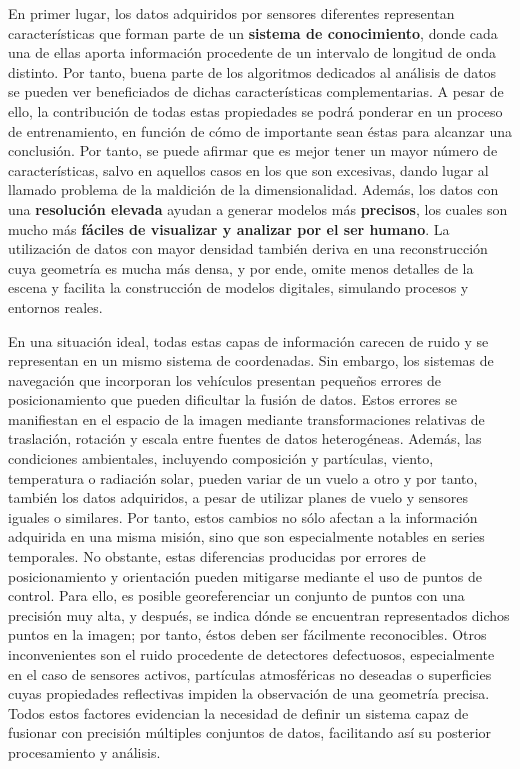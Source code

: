 En primer lugar, los datos adquiridos por sensores diferentes representan características que forman parte de un \textbf{sistema de conocimiento}, donde cada una de ellas aporta información procedente de un intervalo de longitud de onda distinto. Por tanto, buena parte de los algoritmos dedicados al análisis de datos se pueden ver beneficiados de dichas características complementarias. A pesar de ello, la contribución de todas estas propiedades se podrá ponderar en un proceso de entrenamiento, en función de cómo de importante sean éstas para alcanzar una conclusión. Por tanto, se puede afirmar que es mejor tener un mayor número de características, salvo en aquellos casos en los que son excesivas, dando lugar al llamado problema de la maldición de la dimensionalidad. Además, los datos con una \textbf{resolución elevada} ayudan a generar modelos más \textbf{precisos}, los cuales son mucho más \textbf{fáciles de visualizar y analizar por el ser humano}. La utilización de datos con mayor densidad también deriva en una reconstrucción cuya geometría es mucha más densa, y por ende, omite menos detalles de la escena y facilita la construcción de modelos digitales, simulando procesos y entornos reales. 

En una situación ideal, todas estas capas de información carecen de ruido y se representan en un mismo sistema de coordenadas. Sin embargo, los sistemas de navegación que incorporan los vehículos presentan pequeños errores de posicionamiento que pueden dificultar la fusión de datos. Estos errores se manifiestan en el espacio de la imagen mediante transformaciones relativas de traslación, rotación y escala entre fuentes de datos heterogéneas. Además, las condiciones ambientales, incluyendo composición y partículas, viento, temperatura o radiación solar, pueden variar de un vuelo a otro y por tanto, también los datos adquiridos, a pesar de utilizar planes de vuelo y sensores iguales o similares. Por tanto, estos cambios no sólo afectan a la información adquirida en una misma misión, sino que son especialmente notables en series temporales. No obstante, estas diferencias producidas por errores de posicionamiento y orientación pueden mitigarse mediante el uso de puntos de control. Para ello, es posible georeferenciar un conjunto de puntos con una precisión muy alta, y después, se indica dónde se encuentran representados dichos puntos en la imagen; por tanto, éstos deben ser fácilmente reconocibles. Otros inconvenientes son el ruido procedente de detectores defectuosos, especialmente en el caso de sensores activos, partículas atmosféricas no deseadas o superficies cuyas propiedades reflectivas impiden la observación de una geometría precisa. Todos estos factores evidencian la necesidad de definir un sistema capaz de fusionar con precisión múltiples conjuntos de datos, facilitando así su posterior procesamiento y análisis.


